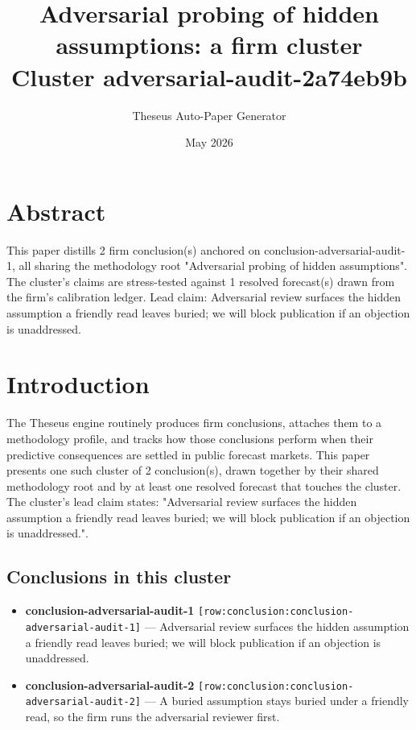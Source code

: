\documentclass[11pt,letterpaper]{article}
\title{\textbf{Adversarial probing of hidden assumptions: a firm cluster}\\[6pt]\large Cluster adversarial-audit-2a74eb9b}
\date{May 2026}
\author{Theseus Auto-Paper Generator}
\newcommand{\rowref}[1]{\texttt{\small[row:#1]}}
\begin{document}
\maketitle
\thispagestyle{empty}

\begin{center}
\end{center}

\vspace{1.5em}

\section*{Abstract}
This paper distills 2 firm conclusion(s) anchored on conclusion-adversarial-audit-1, all sharing the methodology root "Adversarial probing of hidden assumptions". The cluster's claims are stress-tested against 1 resolved forecast(s) drawn from the firm's calibration ledger. Lead claim: Adversarial review surfaces the hidden assumption a friendly read leaves buried; we will block publication if an objection is unaddressed.

\section{Introduction}
The Theseus engine routinely produces firm conclusions, attaches them to a methodology profile, and tracks how those conclusions perform when their predictive consequences are settled in public forecast markets. This paper presents one such cluster of 2 conclusion(s), drawn together by their shared methodology root and by at least one resolved forecast that touches the cluster. The cluster's lead claim states: "Adversarial review surfaces the hidden assumption a friendly read leaves buried; we will block publication if an objection is unaddressed.".

\subsection*{Conclusions in this cluster}
\begin{itemize}[leftmargin=1.5em]
  \item \textbf{conclusion-adversarial-audit-1} \rowref{conclusion:conclusion-adversarial-audit-1} --- Adversarial review surfaces the hidden assumption a friendly read leaves buried; we will block publication if an objection is unaddressed.
  \item \textbf{conclusion-adversarial-audit-2} \rowref{conclusion:conclusion-adversarial-audit-2} --- A buried assumption stays buried under a friendly read, so the firm runs the adversarial reviewer first.
\end{itemize}
\end{document}
